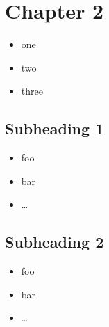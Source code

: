 \section{Chapter 2}\label{chapter-2}

\begin{itemize}
\itemsep1pt\parskip0pt
\item
  one
\item
  two
\item
  three
\end{itemize}

\subsection{Subheading 1}\label{subheading-1}

\begin{itemize}
\itemsep1pt\parskip0pt
\item
  foo
\item
  bar
\item
  \ldots{}
\end{itemize}

\subsection{Subheading 2}\label{subheading-2}

\begin{itemize}
\itemsep1pt\parskip0pt
\item
  foo
\item
  bar
\item
  \ldots{}
\end{itemize}
